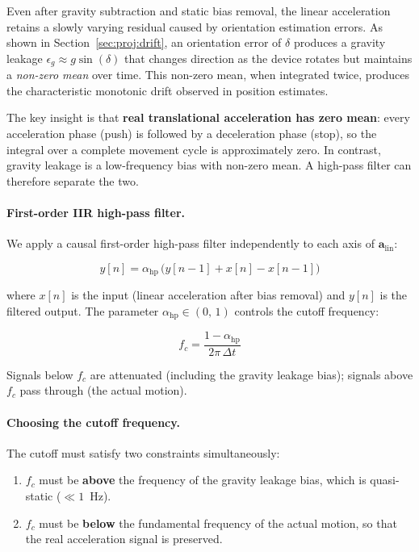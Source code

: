 Even after gravity subtraction and static bias removal, the linear
acceleration retains a slowly varying residual caused by orientation
estimation errors. As shown in
Section~\ref{sec:proj:drift}, an orientation error of $\delta$ produces a
gravity leakage $\epsilon_g \approx g\sin(\delta)$ that changes direction as
the device rotates but maintains a \emph{non-zero mean} over time. This
non-zero mean, when integrated twice, produces the characteristic
monotonic drift observed in position estimates.

The key insight is that \textbf{real translational acceleration has zero
mean}: every acceleration phase (push) is followed by a deceleration phase
(stop), so the integral over a complete movement cycle is approximately zero.
In contrast, gravity leakage is a low-frequency bias with non-zero mean. A
high-pass filter can therefore separate the two.

\paragraph{First-order IIR high-pass filter.}
We apply a causal first-order high-pass filter independently to each axis of
$\mathbf{a}_\text{lin}$:

\begin{equation}
  y[n] = \alpha_\text{hp}\,\bigl(y[n-1] + x[n] - x[n-1]\bigr)
  \label{eq:highpass}
\end{equation}

\noindent where $x[n]$ is the input (linear acceleration after bias removal)
and $y[n]$ is the filtered output. The parameter
$\alpha_\text{hp} \in (0,\,1)$ controls the cutoff frequency:

\begin{equation}
  f_c = \frac{1 - \alpha_\text{hp}}{2\pi\,\Delta t}
  \label{eq:hp_cutoff}
\end{equation}

\noindent Signals below $f_c$ are attenuated (including the gravity leakage
bias); signals above $f_c$ pass through (the actual motion).

\paragraph{Choosing the cutoff frequency.}
The cutoff must satisfy two constraints simultaneously:

\begin{enumerate}
  \item $f_c$ must be \textbf{above} the frequency of the gravity leakage
        bias, which is quasi-static ($\ll 1$~Hz).
  \item $f_c$ must be \textbf{below} the fundamental frequency of the actual
        motion, so that the real acceleration signal is preserved.
\end{enumerate}

